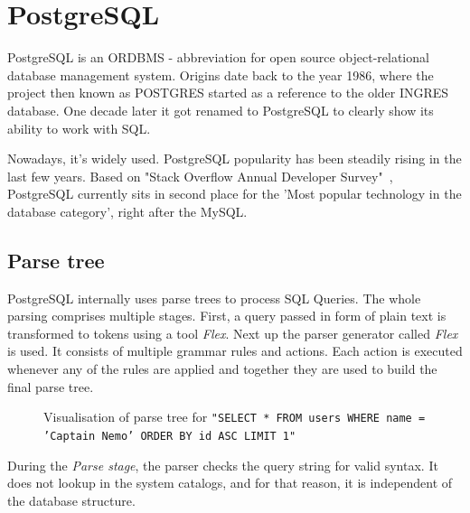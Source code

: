 \section{PostgreSQL}
PostgreSQL is an ORDBMS - abbreviation for open source object-relational database management system. Origins date back to the year 1986, where the project then known as POSTGRES started as a reference to the older INGRES database. One decade later it got renamed to PostgreSQL to clearly show its ability to work with SQL.\cite{PostgreSQL} 

Nowadays, it's widely used. PostgreSQL popularity has been steadily rising in the last few years. Based on "Stack Overflow Annual Developer Survey"~\cite{Stackoverflow survey}, PostgreSQL currently sits in second place for the 'Most popular technology in the database category', right after the MySQL.

\subsection{Parse tree}
PostgreSQL internally uses parse trees to process SQL Queries. The whole parsing comprises multiple stages. First, a query passed in form of plain text is transformed to tokens using a tool \textit{Flex}. Next up the parser generator called \textit{Flex} is used. It consists of multiple grammar rules and actions. Each action is executed whenever any of the rules are applied and together they are used to build the final parse tree.

\newpage

\begin{figure}[h]
  \caption {Visualisation of parse tree for \texttt{"SELECT * FROM users WHERE name = 'Captain Nemo' ORDER BY id ASC LIMIT 1"}}
\end{figure}

During the \textit{Parse stage}, the parser checks the query string for valid syntax. It does not lookup in the system catalogs, and for that reason, it is independent of the database structure.


